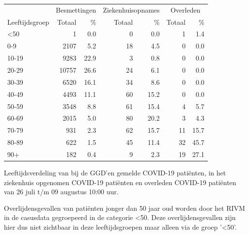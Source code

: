 \documentclass[
  english,
  man,floatsintext]{apa6}
\begin{document}
\begin{table}
\centering\begingroup\fontsize{11}{13}\selectfont

\begin{threeparttable}
\begin{tabular}{lrrrrrr}
\toprule
\multicolumn{1}{c}{ } & \multicolumn{2}{c}{Besmettingen} & \multicolumn{2}{c}{Ziekenhuisopnames} & \multicolumn{2}{c}{Overleden} \\
\cmidrule(l{3pt}r{3pt}){2-3} \cmidrule(l{3pt}r{3pt}){4-5} \cmidrule(l{3pt}r{3pt}){6-7}
Leeftijdsgroep & Totaal & \% & Totaal & \% & Totaal & \%\\
\midrule
<50 & 1 & 0.0 & 0 & 0.0 & 1 & 1.4\\
0-9 & 2107 & 5.2 & 18 & 4.5 & 0 & 0.0\\
10-19 & 9283 & 22.9 & 3 & 0.8 & 0 & 0.0\\
20-29 & 10757 & 26.6 & 24 & 6.1 & 0 & 0.0\\
30-39 & 6520 & 16.1 & 34 & 8.6 & 0 & 0.0\\
40-49 & 4493 & 11.1 & 60 & 15.2 & 0 & 0.0\\
50-59 & 3548 & 8.8 & 61 & 15.4 & 4 & 5.7\\
60-69 & 2015 & 5.0 & 80 & 20.2 & 3 & 4.3\\
70-79 & 931 & 2.3 & 62 & 15.7 & 11 & 15.7\\
80-89 & 622 & 1.5 & 45 & 11.4 & 32 & 45.7\\
90+ & 182 & 0.4 & 9 & 2.3 & 19 & 27.1\\
\bottomrule
\end{tabular}
\begin{tablenotes}
\item[1] Leeftijdsverdeling van bij de GGD’en gemelde COVID-19 patiënten, in het ziekenhuis opgenomen COVID-19 patiënten en overleden COVID-19 patiënten van 26 juli t/m 09 augustus 10:00 uur.
\item[2] Overlijdensgevallen van patiënten jonger dan 50 jaar oud worden door het RIVM in de casusdata gegroepeerd in de categorie <50. Deze overlijdensgevallen zijn hier dus niet zichtbaar in deze leeftijdsgroepen maar alleen via de groep '<50'.
\end{tablenotes}
\end{threeparttable}
\endgroup{}
\end{table}

\newpage
\end{document}
